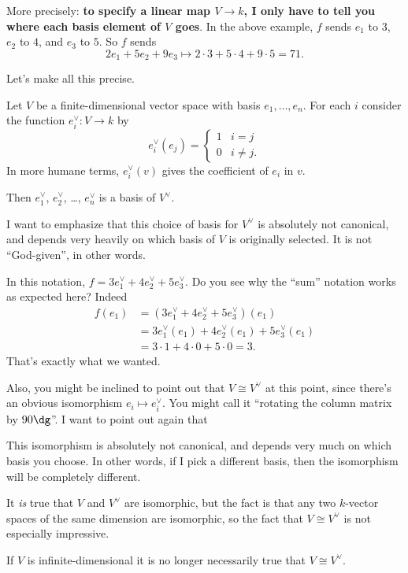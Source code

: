 More precisely: \textbf{to specify a linear map $V \to k$,
I only have to tell you where each basis element of $V$ goes}.
In the above example, $f$ sends $e_1$ to $3$, $e_2$ to $4$, and $e_3$ to $5$.
So $f$ sends \[ 2e_1 + 5e_2 + 9e_3 \mapsto 2 \cdot 3 + 5 \cdot 4 + 9 \cdot 5 = 71. \]

Let's make all this precise.
\begin{proposition}
	Let $V$ be a finite-dimensional vector space with basis $e_1, \dots, e_n$.
	For each $i$ consider the function $e_i^\vee : V \to k$ by
	\[
		e_i^\vee(e_j)
		= \begin{cases}
			1 & i=j \\
			0 & i \neq j.
		\end{cases}
	\]
	In more humane terms, $e_i^\vee(v)$ gives the coefficient of $e_i$ in $v$.

	Then $e_1^\vee$, $e_2^\vee$, \dots, $e_n^\vee$ is a basis of $V^\vee$.
\end{proposition}
I want to emphasize that this choice of basis for $V^\vee$ is absolutely not canonical, and depends very heavily on which basis of $V$ is originally selected.
It is not ``God-given'', in other words.

\begin{example}
	In this notation, $f = 3e_1^\vee + 4e_2^\vee + 5e_3^\vee$.
	Do you see why the ``sum'' notation works as expected here?
	Indeed
	\begin{align*}
		f(e_1) &= (3e_1^\vee + 4e_2^\vee + 5e_3^\vee)(e_1) \\
		&= 3e_1^\vee(e_1) + 4e_2^\vee(e_1) + 5e_3^\vee(e_1) \\
		&= 3 \cdot 1 + 4 \cdot 0 + 5 \cdot 0 = 3.
	\end{align*}
	That's exactly what we wanted.
\end{example}

Also, you might be inclined to point out that $V \cong V^\vee$ at this point,
since there's an obvious isomorphism $e_i \mapsto e_i^\vee$.
You might call it ``rotating the column matrix by $90\dg$''.
I want to point out again that
\begin{itemize}
	\ii This isomorphism is absolutely not canonical,
	and depends very much on which basis you choose.
	In other words, if I pick a different basis, then the isomorphism
	will be completely different.

	It \emph{is} true that $V$ and $V^\vee$ are isomorphic,
	but the fact is that any two $k$-vector spaces of the same dimension are isomorphic,
	so the fact that $V \cong V^\vee$ is not especially impressive.
	
	\ii If $V$ is infinite-dimensional it is no longer necessarily true that $V \cong V^\vee$.
\end{itemize}

